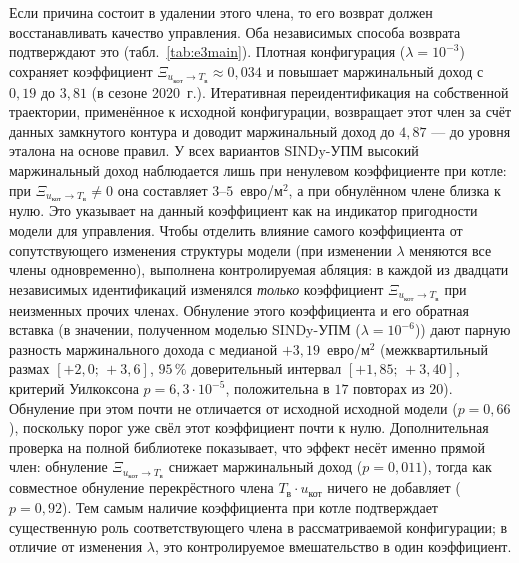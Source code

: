 \documentclass[12pt,a4paper,leqno]{article}
\newcommand{\Tin}{T_{\text{в}}}          %
\newcommand{\uBoil}{u_{\text{кот}}}       %
\begin{document}
Если причина состоит в удалении этого члена, то его возврат должен восстанавливать
качество управления. Оба независимых способа возврата подтверждают это
(табл.~\ref{tab:e3main}). Плотная конфигурация ($\lambda=10^{-3}$) сохраняет коэффициент
$\Xi_{\uBoil\to \Tin}\approx0{,}034$ и повышает маржинальный доход с $0{,}19$ до $3{,}81$ (в сезоне
2020~г.). Итеративная переидентификация на собственной траектории, применённое к исходной
конфигурации, возвращает этот член за счёт данных замкнутого контура и доводит маржинальный доход до
$4{,}87$ — до уровня эталона на основе правил. У всех вариантов SINDy-УПМ высокий маржинальный доход
наблюдается лишь при ненулевом коэффициенте при котле: при $\Xi_{\uBoil\to \Tin}\neq0$ она
составляет $3$--$5$~евро/м$^2$, а при обнулённом члене близка к нулю. Это указывает на данный
коэффициент как на индикатор пригодности модели для управления. Чтобы отделить
влияние самого коэффициента от сопутствующего изменения структуры модели (при изменении
$\lambda$ меняются все члены одновременно), выполнена контролируемая абляция: в каждой из
двадцати независимых идентификаций изменялся \emph{только} коэффициент
$\Xi_{\uBoil\to \Tin}$ при неизменных прочих членах. Обнуление этого коэффициента и его
обратная вставка (в значении, полученном моделью SINDy-УПМ ($\lambda=10^{-6}$)) дают парную разность
маржинального дохода с медианой $+3{,}19$~евро/м$^2$ (межквартильный размах $[+2{,}0;\,+3{,}6]$,
$95\,\%$ доверительный интервал $[+1{,}85;\,+3{,}40]$, критерий Уилкоксона
$p=6{,}3\cdot10^{-5}$, положительна в $17$ повторах из $20$). Обнуление при этом почти не
отличается от исходной исходной модели ($p=0{,}66$), поскольку порог уже свёл этот
коэффициент почти к нулю. Дополнительная проверка на полной библиотеке показывает, что
эффект несёт именно прямой член: обнуление $\Xi_{\uBoil\to \Tin}$ снижает маржинальный доход
($p=0{,}011$), тогда как совместное обнуление перекрёстного члена
$\Tin\!\cdot u_{\text{кот}}$ ничего не добавляет ($p=0{,}92$). Тем самым наличие
коэффициента при котле подтверждает существенную роль соответствующего члена в рассматриваемой конфигурации; в отличие от изменения
$\lambda$, это контролируемое вмешательство в один коэффициент.
\end{document}
